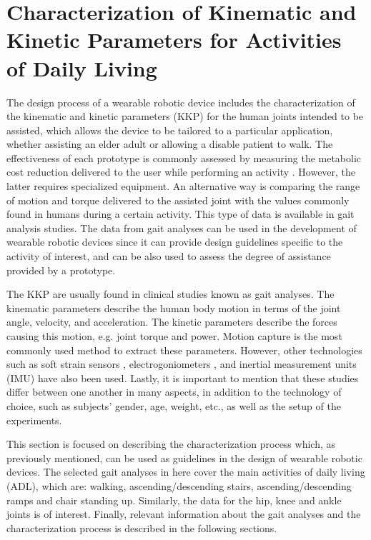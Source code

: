 \section{Characterization of Kinematic and Kinetic Parameters for Activities of Daily Living}
\label{sec:characterizationKKP}

The design process of a wearable robotic device includes the characterization of the kinematic and kinetic parameters (KKP) for the human joints intended to be assisted, which allows the device to be tailored to a particular application, whether assisting an elder adult or allowing a disable patient to walk. The effectiveness of each prototype is commonly assessed by measuring the metabolic cost reduction delivered to the user while performing an activity \cite{panizzolo2016biologically}. However, the latter requires specialized equipment. An alternative way is comparing the range of motion and torque delivered to the assisted joint with the values commonly found in humans during a certain activity. This type of data is available in gait analysis studies. The data from gait analyses can be used in the development of wearable robotic devices since it can provide design guidelines specific to the activity of interest, and can be also used to assess the degree of assistance provided by a prototype.

The KKP are usually found in clinical studies known as gait analyses. The kinematic parameters describe the human body motion in terms of the joint angle, velocity, and acceleration. The kinetic
parameters describe the forces causing this motion, e.g. joint torque and power. Motion capture is the most commonly used method to extract these parameters. However, other technologies such as soft strain sensors \cite{mengucc2014wearable}, electrogoniometers \cite{wu2011electromyography}, and inertial measurement units (IMU) have also been used. Lastly, it is important to mention that these studies differ between one another in many aspects, in addition to the technology of choice, such as subjects' gender, age, weight, etc., as well as the setup of the experiments.

This section is focused on describing the characterization process which, as previously mentioned, can be used as guidelines in the design of wearable robotic devices. The selected gait analyses in here cover the main activities of daily living (ADL), which are: walking, ascending/descending stairs, ascending/descending ramps and chair standing up. Similarly, the data for the hip, knee and ankle joints is of interest. Finally, relevant information about the gait analyses and the characterization process is described in the following sections.

